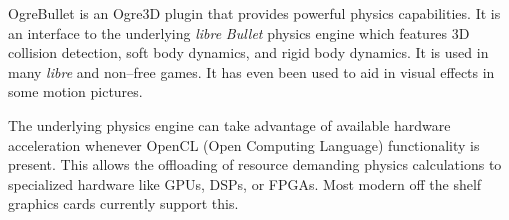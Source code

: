 

\startitemize[4]

OgreBullet is an Ogre3D plugin that provides powerful physics capabilities. It is an interface to the underlying {\it libre} {\it Bullet} physics engine which features 3D collision detection, soft body dynamics, and rigid body dynamics. It is used in many {\it libre} and non--free games. It has even been used to aid in visual effects in some motion pictures. 

The underlying physics engine can take advantage of available hardware acceleration whenever OpenCL (Open Computing Language) functionality is present. This allows the offloading of resource demanding physics calculations to specialized hardware like GPUs, DSPs, or FPGAs. Most modern off the shelf graphics cards currently support this.
\stopitemize

